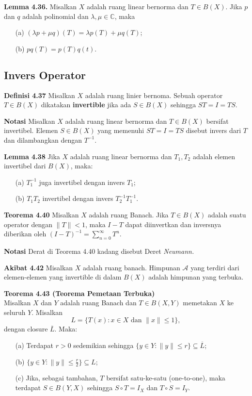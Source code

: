 \documentclass{article}
\begin{document}
\begin{multicols}{2}
  \textbf{Lemma 4.36.} Misalkan \(X\) adalah ruang linear bernorma dan \(T \in B(X)\). Jika \(p\) dan \(q\) adalah polinomial dan \(\lambda, \mu\in \mathbb{C}\), maka
  \begin{itemize}
    \item[(a)] \((\lambda p + \mu q)(T) = \lambda p(T) + \mu q(T)\);

    \item[(b)] \(pq(T) = p(T)q(t).\)
  \end{itemize}
  \vspace{-1em}
  \subsection*{Invers Operator}
  \vspace{-1em}
  \textbf{Definisi 4.37} Misalkan $X$ adalah ruang linier bernoma. Sebuah operator $T \in B(X)$ dikatakan \textbf{invertible} jika ada $S \in B(X)$ sehingga $ST=I=TS$.

  \textbf{Notasi} Misalkan $X$ adalah ruang linear bernorma dan $T \in B(X)$ bersifat invertibel.
  Elemen $S \in B(X)$ yang memenuhi $ST = I = TS$ disebut invers dari $T$ dan dilambangkan dengan $T^{-1}$.

  \textbf{Lemma 4.38} Jika $X$ adalah ruang linear bernorma dan $T_1, T_2$ adalah elemen invertibel dari $B(X)$, maka:
  \begin{itemize}
    \item [(a)] $T_1^{-1}$ juga invertibel dengan invers $T_1$;
    \item [(b)] $T_1 T_2$ invertibel dengan invers $T_2^{-1} T_1^{-1}$.
  \end{itemize}

  \textbf{Teorema 4.40} Misalkan $X$ adalah ruang Banach. Jika $T \in B(X)$ adalah suatu operator dengan $\|T\| < 1$, maka $I - T$ dapat diinvertkan dan inversnya diberikan oleh $(I - T)^{-1} =\sum_{n=0}^{\infty} T^n$.

  \textbf{Notasi} Derat di Teorema 4.40 kadang disebut Deret \textit{Neumann.}

  \textbf{Akibat 4.42} Misalkan $X$ adalah ruang banach. Himpunan $\mathcal{A}$ yang terdiri dari elemen-elemen yang invertible di dalam $B(X)$ adalah himpunan yang terbuka.

  \textbf{Teorema 4.43 (Teorema Pemetaan Terbuka)}\\
  Misalkan $X$ dan $Y$ adalah ruang Banach dan $T \in B(X, Y)$ memetakan $X$ ke seluruh $Y$. Misalkan
  \[
    L = \{T(x) : x \in X \text{ dan } \|x\| \leq 1\},
  \]
  dengan closure $\overline{L}$. Maka:
  \begin{itemize}
    \item[(a)] Terdapat $r > 0$ sedemikian sehingga $\{y \in Y : \|y\| \leq r\} \subseteq \overline{L}$;
    \item[(b)] $\{y \in Y : \|y\| \leq \frac{r}{2}\} \subseteq L$;
    \item[(c)] Jika, sebagai tambahan, $T$ bersifat satu-ke-satu (one-to-one), maka terdapat $S \in B(Y, X)$ sehingga $S \circ T = I_X$ dan $T \circ S = I_Y$.
  \end{itemize}


\end{multicols}
\end{document}
